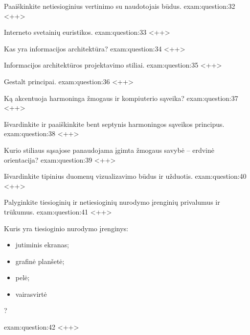 \begin{question}{%
  Paaiškinkite netiesioginius vertinimo su naudotojais būdus.
  }{exam:question:32}
  <++>
\end{question}

\begin{question}{%
  Interneto svetainių euristikos.
  }{exam:question:33}
  <++>
\end{question}

\begin{question}{%
  Kas yra informacijos architektūra?
  }{exam:question:34}
  <++>
\end{question}

\begin{question}{%
  Informacijos architektūros projektavimo stiliai.
  }{exam:question:35}
  <++>
\end{question}

\begin{question}{%
  Gestalt principai.
  }{exam:question:36}
  <++>
\end{question}

\begin{question}{%
  Ką akcentuoja harmoninga žmogaus ir kompiuterio sąveika?
  }{exam:question:37}
  <++>
\end{question}

\begin{question}{%
  Išvardinkite ir paaiškinkite bent septynis harmoningos sąveikos
  principus.
  }{exam:question:38}
  <++>
\end{question}

\begin{question}{%
  Kurio stiliaus sąsajose panaudojama įgimta žmogaus savybė – erdvinė
  orientacija?
  }{exam:question:39}
  <++>
\end{question}

\begin{question}{%
  Išvardinkite tipinius duomenų vizualizavimo būdus ir užduotis.
  }{exam:question:40}
  <++>
\end{question}

\begin{question}{%
  Palyginkite tiesioginių ir netiesioginių nurodymo įrenginių privalumus
  ir trūkumus.
  }{exam:question:41}
  <++>
\end{question}

\begin{question}{%
  Kuris yra tiesioginio nurodymo įrenginys:
  \begin{itemize}
    \item jutiminis ekranas;
    \item grafinė planšetė;
    \item pelė;
    \item vairasvirtė
  \end{itemize}
  ?
  }{exam:question:42}
  <++>
\end{question}

